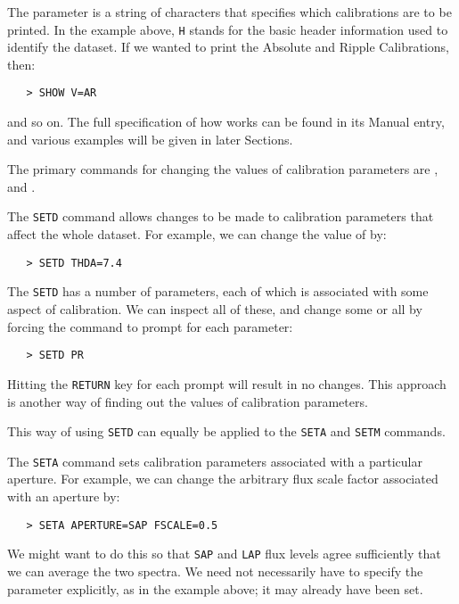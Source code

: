 The 
 parameter is a string of characters that specifies which
calibrations are to be printed.
In the example above, \verb+H+ stands for the basic header information used to
identify the dataset.
If we wanted to print the Absolute and Ripple Calibrations, then:

\begin{verbatim}
   > SHOW V=AR
\end{verbatim}

and so on.  The full specification of how 
 works can be found in its
Manual entry, and various examples will be given in later Sections.

The primary commands for changing the values of calibration parameters
are , 
 and \@.

The \verb+SETD+ command allows changes to be made to calibration parameters
that affect the whole dataset. For example, we can change the value of
 by:

\begin{verbatim}
   > SETD THDA=7.4
\end{verbatim}

The \verb+SETD+ has a number of parameters, each of which is associated with
some aspect of calibration.  We can inspect all of these, and change some or
all by forcing the command to prompt for each parameter:

\begin{verbatim}
   > SETD PR
\end{verbatim}

Hitting the \verb+RETURN+ key for each prompt will result in no changes.  This
approach is another way of finding out the values of calibration parameters.

This way of using \verb+SETD+ can equally be applied to the \verb+SETA+ and
\verb+SETM+ commands.

The \verb+SETA+ command sets calibration parameters associated with a particular
aperture.  For example, we can change the arbitrary flux scale factor
associated with an aperture by:

\begin{verbatim}
   > SETA APERTURE=SAP FSCALE=0.5
\end{verbatim}

We might want to do this so that \verb+SAP+ and \verb+LAP+ flux levels agree
sufficiently that we can average the two spectra.  We need not
necessarily have to specify the 
 parameter explicitly, as in the
example above; it may already have been set.

